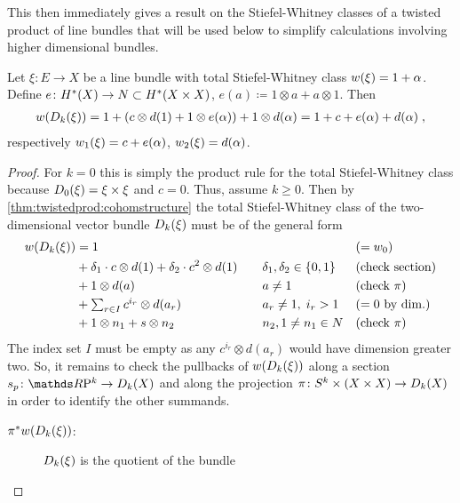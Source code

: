 This then immediately gives a result on the Stiefel-Whitney classes of
a twisted product of line bundles that will be used below to simplify
calculations involving higher dimensional bundles.
\begin{Cor}\label{cor:twistedprod:swlinebdl}
  Let $\xi\colon E\to X$ be a line bundle with total Stiefel-Whitney
  class ${w}(\xi)=1+\alpha$.
  Define $e\colon H^*(X)\to N\subset H^*(X\times X)$,
  $e(a)\coloneqq 1\otimes a+a\otimes 1$.
  Then
  \begin{gather*}
    {w}(D_{k}({\xi})) = 1+ (c\otimes d(1)+1\otimes
    e(\alpha)) + 1\otimes d(\alpha)
    = 1+c+e(\alpha)+d(\alpha)
    \;,
  \end{gather*}
  respectively ${w_{1}}(\xi) = c+e(\alpha)$, ${w_{2}}(\xi)=d(\alpha)$.
  \begin{proof}
    For $k=0$ this is simply the product rule for the total
    Stiefel-Whitney class because $D_{0}({\xi})=\xi\times\xi$
    and $c=0$. Thus, assume $k\geq0$.
    Then by \autoref{thm:twistedprod:cohomstructure} the total
    Stiefel-Whitney class of the two-dimensional vector bundle
    $D_{k}({\xi})$ must be of the general form
    \begin{align*}
      {w}(D_{k}({\xi}))
      &=
        1 &\quad&&&{(=w_{0})} \\
      &+ \delta_1\cdot c\otimes d(1) + \delta_2\cdot c^2\otimes d(1)
          &&\delta_1,\delta_2\in\{0,1\}
            &&{(\text{check section})}\\
      &+ 1\otimes d(a)
          &&a \neq 1
                &&{(\text{check $\pi$})} \\
      &+ {\textstyle \sum_{r\in I} c^{i_r}\otimes d(a_r)}
          &&a_r\neq 1,\; i_r>1
            &&{(=0\text{ by dim.})} \\
      &+ 1\otimes n_1 + s\otimes n_2
          &&n_2, 1\neq n_1\in N
                &&{(\text{check $\pi$})}
    \end{align*}
    The index set $I$ must be empty as any $c^{i_r}\otimes d(a_r)$
    would have dimension greater two.
    So, it remains to check the pullbacks of ${w}(D_{k}({\xi}))$
    along a section $s_p\colon\RP k\to\Twistedprod{k}{X}$ and along
    the projection
    $\pi\colon S^{k}\times(X\times X)\to D_{k}({X})$
    in order to identify the other summands.
    \begin{description}
    \item[${\pi}^*{w}(D_{k}({\xi}))$:]
      $D_{k}({\xi})$ is the quotient of the bundle

\end{description}
\end{proof}
\end{Cor}
